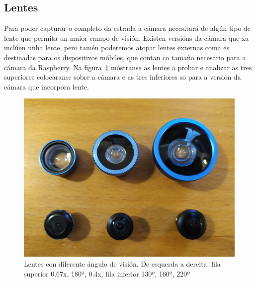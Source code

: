 \subsection{Lentes}
Para poder capturar o completo da estrada a cámara necesitará de algún tipo de lente que permita un maior campo de visión. Existen versións da cámara que xa inclúen unha lente, pero tamén poderemos atopar lentes externas coma es destinadas para os dispositivos móbiles, que contan co tamaño necesario para a cámara da Raspberry. Na figura~\ref{fig:lentes} móstranse as lentes a probar e analizar as tres superiores colocaranse sobre a cámara e as tres inferiores so para a versión da cámara que incorpora lente.
\begin{figure}[tb]
  \centering
  \includegraphics[scale=.06]{imaxes/lentes.jpg}
  \caption{Lentes con diferente ángulo de visión. De esquerda a dereita: fila superior 0.67x, 180º, 0.4x, fila inferior 130º, 160º, 220º }
  \label{fig:lentes}
\end{figure}

